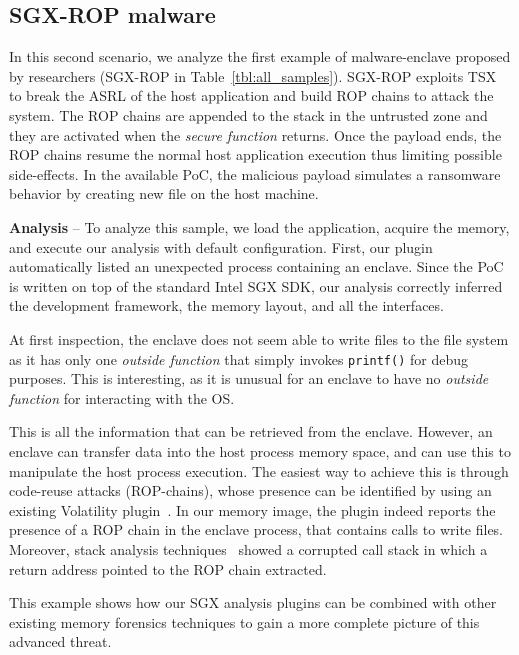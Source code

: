 \subsection{SGX-ROP malware}
\label{ssec:sgx-rop}

In this second scenario, we analyze the first example of malware-enclave 
proposed by 
researchers (SGX-ROP in Table~\ref{tbl:all_samples}).
SGX-ROP exploits TSX to break the ASRL of the host application and
build ROP chains to attack the system.
The ROP chains are appended to the stack in the untrusted zone and they are
activated when the \emph{secure function} returns.
Once the payload ends, the ROP chains resume the normal host application
execution thus limiting possible side-effects.
In the available PoC, the malicious payload simulates a ransomware behavior by 
creating 
new file on the host machine.

\vspace{0.2cm}
\noindent \textbf{Analysis} --
To analyze this sample, we load the application, acquire the memory, and
execute our analysis with default configuration.
First, our plugin automatically listed an unexpected process containing an 
enclave.
Since the PoC is written on top of the standard Intel SGX SDK, our analysis
correctly inferred the development framework, the memory layout, and all the
interfaces.

At first inspection, the enclave does not seem able to write files to the
file system as it has only one \emph{outside function} that simply
invokes \texttt{printf()} for debug purposes.
This is interesting, as it is unusual for an enclave to have no \emph{outside 
function} for interacting with the OS.

This is all the information that can be retrieved from the enclave.
However, an enclave can transfer data into the host process memory space, and 
can use
this to manipulate the host process execution.
The easiest way to achieve this is through code-reuse attacks (\eg ROP-chains),
whose presence can be identified by using an existing Volatility 
plugin~\citep{ropfind}. 
In our memory image, the plugin indeed reports the presence of a ROP chain in 
the enclave
process, that contains calls to write files.
Moreover, stack analysis techniques~\citep{smulders2013user} showed a corrupted 
call stack in which a return address pointed to the ROP chain extracted.

This example shows how our SGX analysis plugins can be combined with other
existing memory forensics techniques to gain a more complete picture
of this advanced threat. 

